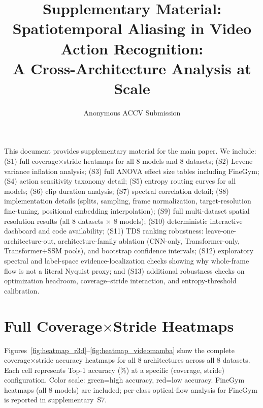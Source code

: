 \documentclass[runningheads]{llncs}
\newcommand{\TDS}{\textsc{TDS}}
\begin{document}
\raggedbottom

\title{\texorpdfstring{Supplementary Material:\\
  Spatiotemporal Aliasing in Video Action Recognition:\\
  A Cross-Architecture Analysis at Scale}{Supplementary Material: Spatiotemporal Aliasing in Video Action Recognition: A Cross-Architecture Analysis at Scale}}

\author{Anonymous ACCV Submission}
\institute{}
\maketitle

\setcounter{section}{0}
\renewcommand\thesection{S\arabic{section}}
\renewcommand\thefigure{S\arabic{figure}}
\renewcommand\thetable{S\arabic{table}}
\setcounter{figure}{0} \setcounter{table}{0}

This document provides supplementary material for the main paper. We include: (S1) full coverage$\times$stride heatmaps for all 8 models and 8 datasets; (S2) Levene variance inflation analysis; (S3) full ANOVA effect size tables including FineGym; (S4) action sensitivity taxonomy detail; (S5) entropy routing curves for all models; (S6) clip duration analysis; (S7) spectral correlation detail; (S8) implementation details (splits, sampling, frame normalization, target-resolution fine-tuning, positional embedding interpolation); (S9) full multi-dataset spatial resolution results (all 8 datasets $\times$ 8 models); (S10) deterministic interactive dashboard and code availability; (S11) \TDS{} ranking robustness: leave-one-architecture-out, architecture-family ablation (CNN-only, Transformer-only, Transformer+SSM pools), and bootstrap confidence intervals; (S12) exploratory spectral and label-space evidence-localization checks showing why whole-frame flow is not a literal Nyquist proxy; and (S13) additional robustness checks on optimization headroom, coverage--stride interaction, and entropy-threshold calibration.

\section{Full Coverage$\times$Stride Heatmaps}
\label{sec:sup_heatmaps}

Figures~\ref{fig:heatmap_r3d}--\ref{fig:heatmap_videomamba} show the complete coverage$\times$stride accuracy heatmaps for all 8 architectures across all 8 datasets. Each cell represents Top-1 accuracy (\%) at a specific (coverage, stride) configuration. Color scale: green=high accuracy, red=low accuracy. FineGym heatmaps (all 8 models) are included; per-class optical-flow analysis for FineGym is reported in supplementary~S7.
\end{document}
